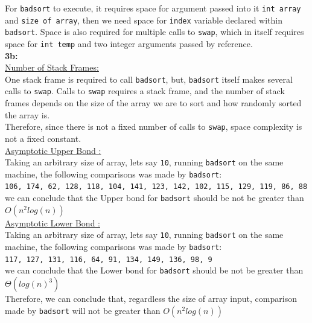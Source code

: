 \documentclass[12pt]{article}
\begin{document}
For \texttt{badsort} to execute, it requires space for argument passed into it \texttt{int array} and \texttt{size of array}, then we need space for \texttt{index} variable declared within \texttt{badsort}.
Space is also required for multiple calls to \texttt{swap}, which in itself requires space for \texttt{int temp} and two integer arguments passed by reference.\\

\textbf{3b:}\\
\underline{Number of Stack Frames:}\\

One stack frame is required to call \texttt{badsort}, but, \texttt{badsort} itself makes several calls to \texttt{swap}. Calls to \texttt{swap} requires a stack frame, and the number of stack frames depends on the size of the array we are to sort and how randomly sorted the array is.\\

Therefore, since there is not a fixed number of  calls to \texttt{swap}, space complexity is not a fixed constant.\\

\underline{Asymptotic Upper Bond :}\\

Taking an arbitrary size of array, lets say \texttt{10}, running \texttt{badsort} on the same machine, the following comparisons was made by \texttt{badsort}:\\

\texttt{106, 174, 62, 128, 118, 104, 141, 123, 142, 102, 115, 129, 119, 86, 88}\\

we can conclude that the Upper bond for \texttt{badsort} should be not be greater than $O(n^2log(n))$\\

\underline{Asymptotic Lower Bond :}\\

Taking an arbitrary size of array, lets say \texttt{10}, running \texttt{badsort} on the same machine, the following comparisons was made by \texttt{badsort}:\\

\texttt{117, 127, 131, 116, 64, 91, 134, 149, 136, 98, 9}\\

we can conclude that the Lower bond for \texttt{badsort} should be not be greater than $\varTheta(log(n)^3)$\\

Therefore, we can conclude that, regardless the size of array input, comparison made by \texttt{badsort} will not be greater than $O(n^2log(n))$
\end{document}

